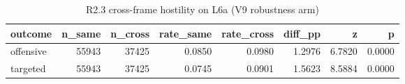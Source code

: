 \begin{table}
\caption{R2.3 cross-frame hostility on L6a (V9 robustness arm)}
\label{tab:r1r2_cross_frame_l6a}
\begin{tabular}{lrrrrrrr}
\toprule
outcome & n\_same & n\_cross & rate\_same & rate\_cross & diff\_pp & z & p \\
\midrule
offensive & 55943 & 37425 & 0.0850 & 0.0980 & 1.2976 & 6.7820 & 0.0000 \\
targeted & 55943 & 37425 & 0.0745 & 0.0901 & 1.5623 & 8.5884 & 0.0000 \\
\bottomrule
\end{tabular}
\end{table}
